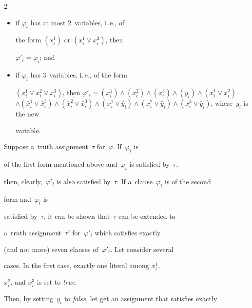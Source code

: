 \begin{multicols}{2}
\begin{itemize}


\item if $\varphi_i$ has at most 2~variables, i.\,e., of


the form $(x^{1}_{i})$ or $(x^{1}_{i} \vee x^{2}_{i})$, then


$\varphi'_{i} =


\varphi_i$; and


\item if $\varphi_i$ has 3~variables, i.\,e., of the form


$(x^{1}_{i}\vee x^{2}_{i}\vee x^{3}_{i})$, then $\varphi'_{i} =


(x^{1}_{i}) \wedge (x^{2}_{i}) \wedge (x^{3}_{i}) \wedge (y_{i})


\wedge


  (\bar{x}^{1}_{i} \vee \bar{x}^{2}_{i})$\linebreak $ \wedge (\bar{x}^{1}_{i} \vee


\bar{x}^{3}_{i}) \wedge


  (\bar{x}^{2}_{i} \vee \bar{x}^{3}_{i}) \wedge (x^{1}_{i} \vee \bar{y}_{i})


\wedge (x^{2}_{i} \vee


  \bar{y}_{i}) \wedge (x^{3}_{i} \vee \bar{y}_{i})$, where~$y_i$ is the new


  variable.


  \end{itemize}





Suppose a~truth assignment~$\tau$ for~$\varphi$. If~$\varphi_i$ is


of the first form mentioned above and~$\varphi_i$ is satisfied by~$\tau$,


then, clearly,~$\varphi'_i$ is also satisfied by~$\tau$. If a~clause~$\varphi_i$ is of the second


form and~$\varphi_i$ is


satisfied by~$\tau$, it can be shown that~$\tau$ can be extended to


a~truth assignment~$\tau'$ for~$\varphi'_i$ which satisfies exactly


(and not more) seven clauses of~$\varphi'_i$. Let consider several


cases. In the first case, exactly one literal among $x^{1}_{i}$,


$x^{2}_{i}$, and $x^{3}_{i}$ is set to \textit{true}.


Then, by setting~$y_i$ to \textit{false}, let get an assignment that satisfies exactly



\end{multicols}
